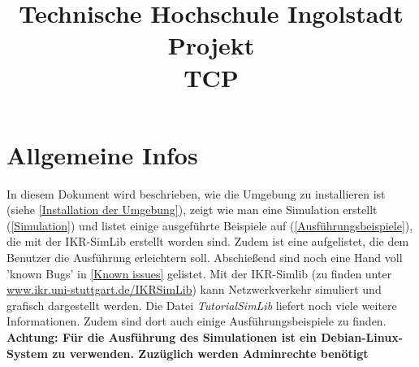 \documentclass[11pt,div=14]{scrartcl}
\title{\LARGE \vspace*{-30pt} Technische Hochschule Ingolstadt \\ \vspace{10pt} Projekt \\ TCP \\ \vspace{6pt}{\Large Wintersemester 16/17 \vspace{40pt} \\ Projektdoku\vspace{10pt} \\ \myTitle \vspace{10pt} \\ von \\ \vspace{6pt}  \myAuthor} \vspace*{-36pt}}
\author{}
\date{}
\begin{document}
\maketitle%
\tableofcontents 


\section{Allgemeine Infos}
\label{Allgemeine Infos}
In diesem Dokument wird beschrieben, wie die Umgebung zu installieren ist (siehe \ref{Installation der Umgebung}), zeigt wie man eine Simulation erstellt (\ref{Simulation}) und listet einige ausgeführte Beispiele auf (\ref{Ausführungsbeispiele}), die mit der IKR-SimLib erstellt worden sind. Zudem ist eine  aufgelistet, die dem Benutzer die Ausführung erleichtern soll. Abschießend sind noch eine Hand voll 'known Bugs' in \ref{Known issues} gelistet.
Mit der IKR-Simlib (zu finden unter \url{www.ikr.uni-stuttgart.de/IKRSimLib}) kann Netzwerkverkehr simuliert und grafisch dargestellt werden. Die Datei \textit{TutorialSimLib} liefert noch viele weitere Informationen. Zudem sind dort auch einige Ausführungsbeispiele zu finden.\\
\textbf{Achtung: Für die Ausführung des Simulationen ist ein Debian-Linux-System zu verwenden. Zuzüglich werden Adminrechte benötigt}
\end{document}
